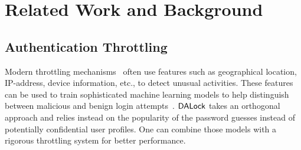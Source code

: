 
\vspace*{-\baselineskip}
\vspace*{-\baselineskip}
\section{Related Work and Background}\label{sec: relatedwork}

\vspace*{-\baselineskip}

\subsection{Authentication Throttling} \label{related: Throttling}

\vspace*{-\baselineskip}


 Modern throttling mechanisms~\cite{sandhu2005system, gordon2014efficiently} often use features such as geographical location, IP-address, device information, etc., to detect unusual activities. These features can be used to train sophisticated machine learning models to help distinguish between malicious and benign login attempts~\cite{NDSS:FJDBG16}. $\mathsf{DALock}$ takes an orthogonal approach and relies instead on the popularity of the password guesses instead of potentially confidential user profiles. One can combine those models with a rigorous throttling system for better performance.


